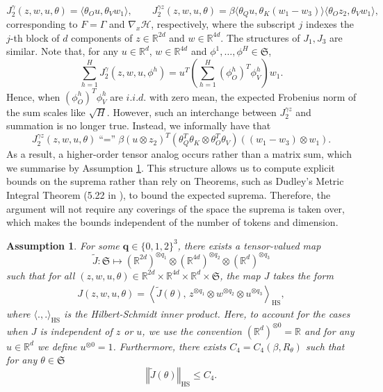 \documentclass{article}
\newtheorem{assumption}{Assumption}
\newcommand{\R}{\mathbb{R}}
\begin{document}
\begin{appendices}
\[
J_2^{\gamma}(z,w,u,\theta) = \langle\theta_O u,\theta_V w_1\rangle, \qquad J_2^{\gamma z}(z,w,u,\theta)  = \beta \langle\theta_Q u,\theta_K(w_1-w_3)\rangle\langle\theta_O z_2,\theta_V w_1\rangle,
\]
 corresponding to $F=\Gamma$ and $\nabla_x \mathcal H$, respectively, where the subscript $j$ indexes the $j$-th block of $d$ components of  $z\in \R^{2d}$ and $w\in \R^{4d}$. The structures of $J_1,J_3$ are similar. Note that, for any $u\in \R^d$, $w\in \R^{4d}$ and $\phi^1,\ldots,\phi^H\in \mathfrak{S}$,
\[
\sum_{h=1}^H J_2^\gamma(z,w,u,\phi^h) = u^T\left(\sum_{h=1}^H(\phi_O^h)^T\phi^h_V \right)w_1.
\]
Hence, when $(\phi^h_O)^T\phi_V^h$ are $i.i.d.$ with zero mean, the expected Frobenius norm of the sum scales like $\sqrt H$. However, such an interchange between  $J_2^{\gamma z}$ and summation is no longer true. Instead, we informally have that
\[
J_2^{\gamma z}(z,w,u,\theta) \;\text{``=''}\;\beta (u\otimes z_2)^T\left(\theta_Q^T\theta_K\otimes \theta_O^T\theta_V \right)((w_1-w_3) \otimes w_1).
\] 
As a result, a higher-order tensor analog occurs rather than a matrix sum, which we summarise by Assumption \ref{assm:MultiLinear}. This structure allows us to compute explicit bounds on the suprema rather than rely on Theorems, such as Dudley's Metric Integral Theorem (5.22 in \cite{Wainwright_2019}), to bound the expected suprema. Therefore, the argument will not require any coverings of the space the suprema is taken over, which makes the bounds independent of the number of tokens and dimension.
\begin{assumption}\label{assm:MultiLinear}
For some $\bm q\in\{0,1,2\}^3$, there exists a tensor-valued map
\[
\widetilde J:\mathfrak S \mapsto  (\mathbb R^{2d})^{\otimes q_1}\otimes(\mathbb R^{4d})^{\otimes q_2}\otimes (\R^d)^{\otimes q_3}
\]
 such that for all $(z,w,u,\theta)\in \mathbb R^{2d}\times \mathbb R^{4d}\times \mathbb R^d\times \mathfrak S$, the map $J$ takes the form
\begin{align*}
J(z,w,u,\theta)
=
    \left\langle \widetilde J(\theta),\, z^{\otimes q_1} \otimes w^{\otimes q_2}\otimes u^{\otimes q_3}\right\rangle_{\mathrm{HS}},
\end{align*}
where $\langle .,.\rangle_\mathrm{HS}$ is the Hilbert-Schmidt inner product. Here, to account for the cases when $J$ is independent of $z$ or $u$, we use the convention $(\R^d)^{\otimes 0}=\R$ and for any $u \in \R^d$ we define $u^{\otimes 0}=1$. Furthermore, there exists $ C_4=C_4(\beta,R_\theta)$ such that for any $\theta\in \mathfrak{S}$
\[
\left\Vert\widetilde J(\theta) \right\Vert_\mathrm{HS}\le C_4 .
\]
\end{assumption}
\end{appendices}
\end{document}

